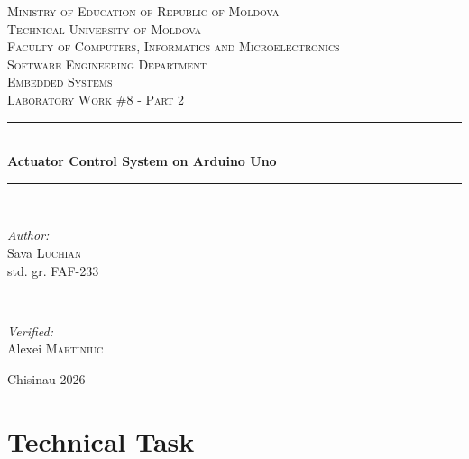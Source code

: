 \documentclass[12pt]{article}
\begin{document}
\begin{titlepage}
  \begin{center}
    \textsc{\large Ministry of Education of Republic of Moldova}\\[0.5cm]
    \textsc{\large Technical University of Moldova}\\[0.5cm]
    \textsc{\large Faculty of Computers, Informatics and Microelectronics}\\[0.5cm]
    \textsc{\large Software Engineering Department}\\[1.2cm]

    \vspace{20mm}
    \textsc{\Large Embedded Systems}\\[0.5cm]
    \textsc{\large Laboratory Work \#8 - Part 2}\\[0.5cm]

    \newcommand{\HRule}{\rule{\linewidth}{0.5mm}}
    \vspace{8mm}
    \HRule\\[0.4cm]
    {\LARGE \bfseries Actuator Control System on Arduino Uno\\[0.3cm]}
    \HRule\\[1.5cm]

    \begin{minipage}[t]{0.45\textwidth}
      \begin{flushleft}\large
        \emph{Author:}\\
        Sava \textsc{Luchian}\\
        std. gr. FAF-233
      \end{flushleft}
    \end{minipage}
    ~
    \begin{minipage}[t]{0.45\textwidth}
      \begin{flushright}\large
        \emph{Verified:}\\
        Alexei \textsc{Martiniuc}
      \end{flushright}
    \end{minipage}

    \vspace*{\fill}
    \large Chisinau 2026
  \end{center}
\end{titlepage}

\setcounter{page}{2}
\pagestyle{fancy}
\fancyhf{}
\rhead{\thepage}

\section*{Technical Task}
\end{document}
